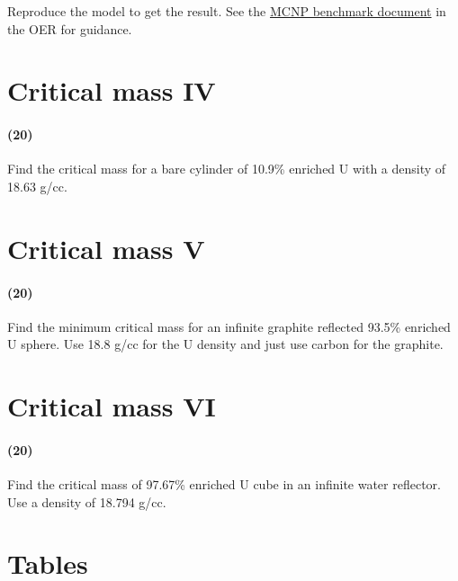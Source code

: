 \documentclass[11pt,a4paper]{article}
\begin{document}
\vspace{\baselineskip}

\noindent Reproduce the model to get the result. See the \href{https://courses.lumenlearning.com/uidaho-nuclear/chapter/mcnp/}{MCNP benchmark document} in the OER for guidance.





\newpage

\section{Critical mass IV}
\paragraph*{(20)}
Find the critical mass for a bare cylinder of 10.9\% enriched U with a density of 18.63 g/cc.





\newpage

\section{Critical mass V}
\paragraph*{(20)}
Find the minimum critical mass for an infinite graphite reflected 93.5\% enriched U sphere. Use 18.8 g/cc for the U density and just use carbon for the graphite.





\newpage

\section{Critical mass VI}
\paragraph*{(20)}
Find the critical mass of 97.67\% enriched U cube in an infinite water reflector. Use a density of 18.794 g/cc.





\newpage

\section*{Tables}
\end{document}
